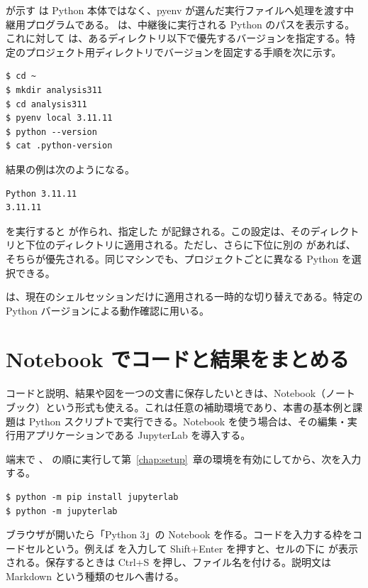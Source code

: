  が示す  は Python 本体ではなく、pyenv が選んだ実行ファイルへ処理を渡す中継用プログラムである。 は、中継後に実行される Python のパスを表示する。これに対して  は、あるディレクトリ以下で優先するバージョンを指定する。特定のプロジェクト用ディレクトリでバージョンを固定する手順を次に示す。

\begin{lstlisting}[numbers=none, xleftmargin=2\zw]
$ cd ~
$ mkdir analysis311
$ cd analysis311
$ pyenv local 3.11.11
$ python --version
$ cat .python-version
\end{lstlisting}

結果の例は次のようになる。

\begin{lstlisting}[numbers=none, xleftmargin=2\zw]
Python 3.11.11
3.11.11
\end{lstlisting}

 を実行すると  が作られ、指定した  が記録される。この設定は、そのディレクトリと下位のディレクトリに適用される。ただし、さらに下位に別の  があれば、そちらが優先される。同じマシンでも、プロジェクトごとに異なる Python を選択できる。

 は、現在のシェルセッションだけに適用される一時的な切り替えである。特定の Python バージョンによる動作確認に用いる。


\section{Notebook でコードと結果をまとめる}
\label{sec:optional-notebook}

コードと説明、結果や図を一つの文書に保存したいときは、Notebook（ノートブック）という形式も使える。これは任意の補助環境であり、本書の基本例と課題は Python スクリプトで実行できる。Notebook を使う場合は、その編集・実行用アプリケーションである JupyterLab を導入する。

端末で 、 の順に実行して第~\ref{chap:setup}~章の環境を有効にしてから、次を入力する。

\begin{lstlisting}[numbers=none, xleftmargin=2\zw]
$ python -m pip install jupyterlab
$ python -m jupyterlab
\end{lstlisting}

ブラウザが開いたら「Python 3」の Notebook を作る。コードを入力する枠をコードセルという。例えば  を入力して Shift+Enter を押すと、セルの下に  が表示される。保存するときは Ctrl+S を押し、ファイル名を付ける。説明文は Markdown という種類のセルへ書ける。

